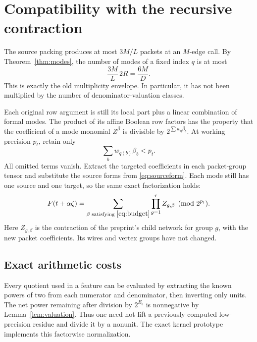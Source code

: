 \documentclass[11pt,letterpaper]{article}
\theoremstyle{definition}\newtheorem{definition}[theorem]{Definition}
\theoremstyle{remark}\newtheorem{remark}[theorem]{Remark}
\begin{document}
\section{Compatibility with the recursive contraction}
\label{sec:compatibility}

The source packing produces at most $3M/L$ packets at an $M$-edge call.
By Theorem~\ref{thm:modes}, the number of modes of a fixed index $q$ is at
most
\begin{equation}\label{eq:colors}
 \frac{3M}{L}\,2R=\frac{6M}{D}.
\end{equation}
This is exactly the old multiplicity envelope. In particular, it has not
been multiplied by the number of denominator-valuation classes.

Each original row argument is still its local part plus a linear combination
of formal modes. The product of its affine Boolean row factors has the
property that the coefficient of a mode monomial $Z^\beta$ is divisible by
$2^{\sum w_q\beta_b}$. At working precision $p_t$, retain only
\begin{equation}\label{eq:budget}
 \sum_b w_{q(b)}\beta_b<p_t.
\end{equation}
All omitted terms vanish. Extract the targeted coefficients in each
packet-group tensor and substitute the source forms from
\eqref{eq:sourceform}. Each mode still has one source and one target, so the
same exact factorization holds:
\begin{equation}\label{eq:recursion}
 F(t+\alpha\zeta)=\sum_{\beta\text{ satisfying }\eqref{eq:budget}}
                         \prod_{g=1}^{r}Z_{g,\beta}\pmod{2^{p_t}}.
\end{equation}
Here $Z_{g,\beta}$ is the contraction of the preprint's child network for
group $g$, with the new packet coefficients. Its wires and vertex groups
have not changed.

\subsection{Exact arithmetic costs}

Every quotient used in a feature can be evaluated by extracting the known
powers of two from each numerator and denominator, then inverting only
units. The net power remaining after division by $2^{E_b}$ is nonnegative
by Lemma~\ref{lem:valuation}. Thus one need not lift a previously computed
low-precision residue and divide it by a nonunit. The exact kernel prototype
implements this factorwise normalization.
\end{document}
